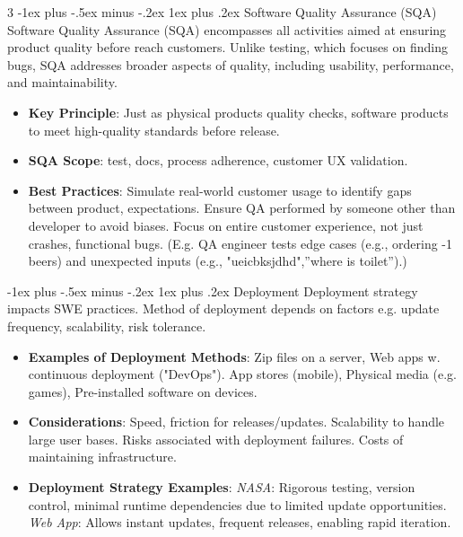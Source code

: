 \documentclass[a4paper, 10pt, landscape]{article}
\makeatletter
\renewcommand{\subsubsection}{\@startsection{subsubsection}{3}{0mm}%
                                {-1ex plus -.5ex minus -.2ex}%
                                {1ex plus .2ex}%
                                {\normalfont\small\bfseries}}
\makeatother
\begin{document}
\begin{multicols*}{3}
\subsubsection{Software Quality Assurance (SQA)}
Software Quality Assurance (SQA) encompasses all activities aimed at ensuring product quality before reach customers. Unlike testing, which focuses on finding bugs, SQA addresses broader aspects of quality, including usability, performance, and maintainability.
\begin{itemize}
    \item \textbf{Key Principle}: Just as physical products quality checks, software products to meet high-quality standards before release.
    \item \textbf{SQA Scope}: test, docs, process adherence, customer UX validation.
    \item \textbf{Best Practices}: Simulate real-world customer usage to identify gaps between product, expectations. Ensure QA performed by someone other than developer to avoid biases. Focus on entire customer experience, not just crashes, functional bugs. (E.g. QA engineer tests edge cases (e.g., ordering -1 beers) and unexpected inputs (e.g., "ueicbksjdhd",''where is toilet'').)
\end{itemize}

\subsubsection{Deployment}
Deployment strategy impacts SWE practices. Method of deployment depends on factors e.g. update frequency, scalability, risk tolerance.
\begin{itemize}[itemsep=-1pt]
    \item \textbf{Examples of Deployment Methods}: Zip files on a server, Web apps w. continuous deployment ("DevOps"). App stores (mobile), Physical media (e.g. games), Pre-installed software on devices.
    \item \textbf{Considerations}: Speed, friction for releases/updates. Scalability to handle large user bases. Risks associated with deployment failures. Costs of maintaining infrastructure.
	\item \textbf{Deployment Strategy Examples}: \textit{NASA}: Rigorous testing, version control, minimal runtime dependencies due to limited update opportunities. \textit{Web App}: Allows instant updates, frequent releases, enabling rapid iteration.
\end{itemize}


\end{multicols*}
\end{document}
